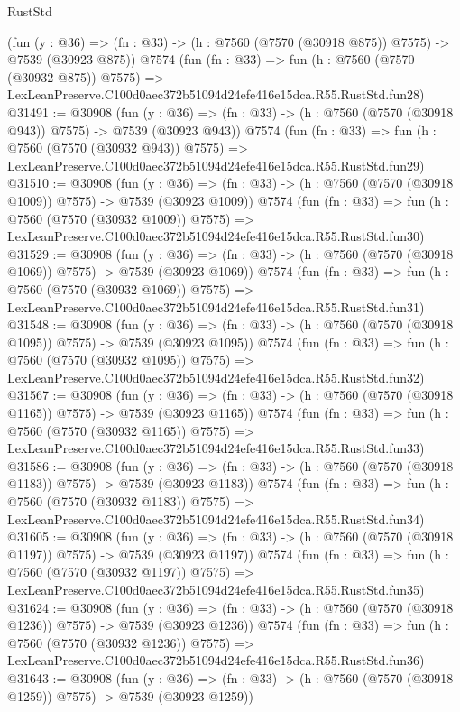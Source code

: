 \begin{lexlean}{RustStd}
\begin{coremodule}
    (fun (y : @36) => (fn : @33) -> (h : @7560 (@7570 (@30918 @875)) @7575) -> @7539 (@30923 @875))
    @7574
    (fun (fn : @33) =>
    fun (h : @7560 (@7570 (@30932 @875)) @7575) =>
    LexLeanPreserve.C100d0aec372b51094d24efe416e15dca.R55.RustStd.fun28)
@31491 := @30908
    (fun (y : @36) => (fn : @33) -> (h : @7560 (@7570 (@30918 @943)) @7575) -> @7539 (@30923 @943))
    @7574
    (fun (fn : @33) =>
    fun (h : @7560 (@7570 (@30932 @943)) @7575) =>
    LexLeanPreserve.C100d0aec372b51094d24efe416e15dca.R55.RustStd.fun29)
@31510 := @30908
    (fun (y : @36) =>
    (fn : @33) -> (h : @7560 (@7570 (@30918 @1009)) @7575) -> @7539 (@30923 @1009))
    @7574
    (fun (fn : @33) =>
    fun (h : @7560 (@7570 (@30932 @1009)) @7575) =>
    LexLeanPreserve.C100d0aec372b51094d24efe416e15dca.R55.RustStd.fun30)
@31529 := @30908
    (fun (y : @36) =>
    (fn : @33) -> (h : @7560 (@7570 (@30918 @1069)) @7575) -> @7539 (@30923 @1069))
    @7574
    (fun (fn : @33) =>
    fun (h : @7560 (@7570 (@30932 @1069)) @7575) =>
    LexLeanPreserve.C100d0aec372b51094d24efe416e15dca.R55.RustStd.fun31)
@31548 := @30908
    (fun (y : @36) =>
    (fn : @33) -> (h : @7560 (@7570 (@30918 @1095)) @7575) -> @7539 (@30923 @1095))
    @7574
    (fun (fn : @33) =>
    fun (h : @7560 (@7570 (@30932 @1095)) @7575) =>
    LexLeanPreserve.C100d0aec372b51094d24efe416e15dca.R55.RustStd.fun32)
@31567 := @30908
    (fun (y : @36) =>
    (fn : @33) -> (h : @7560 (@7570 (@30918 @1165)) @7575) -> @7539 (@30923 @1165))
    @7574
    (fun (fn : @33) =>
    fun (h : @7560 (@7570 (@30932 @1165)) @7575) =>
    LexLeanPreserve.C100d0aec372b51094d24efe416e15dca.R55.RustStd.fun33)
@31586 := @30908
    (fun (y : @36) =>
    (fn : @33) -> (h : @7560 (@7570 (@30918 @1183)) @7575) -> @7539 (@30923 @1183))
    @7574
    (fun (fn : @33) =>
    fun (h : @7560 (@7570 (@30932 @1183)) @7575) =>
    LexLeanPreserve.C100d0aec372b51094d24efe416e15dca.R55.RustStd.fun34)
@31605 := @30908
    (fun (y : @36) =>
    (fn : @33) -> (h : @7560 (@7570 (@30918 @1197)) @7575) -> @7539 (@30923 @1197))
    @7574
    (fun (fn : @33) =>
    fun (h : @7560 (@7570 (@30932 @1197)) @7575) =>
    LexLeanPreserve.C100d0aec372b51094d24efe416e15dca.R55.RustStd.fun35)
@31624 := @30908
    (fun (y : @36) =>
    (fn : @33) -> (h : @7560 (@7570 (@30918 @1236)) @7575) -> @7539 (@30923 @1236))
    @7574
    (fun (fn : @33) =>
    fun (h : @7560 (@7570 (@30932 @1236)) @7575) =>
    LexLeanPreserve.C100d0aec372b51094d24efe416e15dca.R55.RustStd.fun36)
@31643 := @30908
    (fun (y : @36) =>
    (fn : @33) -> (h : @7560 (@7570 (@30918 @1259)) @7575) -> @7539 (@30923 @1259))

\end{coremodule}
\end{lexlean}
